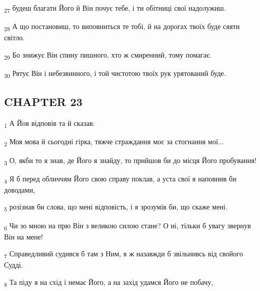 \begin{tcolorbox}
\textsubscript{27} будеш благати Його й Він почує тебе, і ти обітниці свої надолужиш.
\end{tcolorbox}
\begin{tcolorbox}
\textsubscript{28} А що постановиш, то виповниться те тобі, й на дорогах твоїх буде сяяти світло.
\end{tcolorbox}
\begin{tcolorbox}
\textsubscript{29} Бо знижує Він спину пишного, хто ж смиренний, тому помагає.
\end{tcolorbox}
\begin{tcolorbox}
\textsubscript{30} Рятує Він і небезвинного, і той чистотою твоїх рук урятований буде.
\end{tcolorbox}
\subsection{CHAPTER 23}
\begin{tcolorbox}
\textsubscript{1} А Йов відповів та й сказав:
\end{tcolorbox}
\begin{tcolorbox}
\textsubscript{2} Моя мова й сьогодні гірка, тяжче страждання моє за стогнання мої...
\end{tcolorbox}
\begin{tcolorbox}
\textsubscript{3} О, якби то я знав, де Його я знайду, то прийшов би до місця Його пробування!
\end{tcolorbox}
\begin{tcolorbox}
\textsubscript{4} Я б перед обличчям Його свою справу поклав, а уста свої я наповнив би доводами,
\end{tcolorbox}
\begin{tcolorbox}
\textsubscript{5} розізнав би слова, що мені відповість, і я зрозумів би, що скаже мені.
\end{tcolorbox}
\begin{tcolorbox}
\textsubscript{6} Чи зо мною на прю Він з великою силою стане? О ні, тільки б увагу звернув Він на мене!
\end{tcolorbox}
\begin{tcolorbox}
\textsubscript{7} Справедливий судився б там з Ним, я ж назавжди б звільнивсь від свойого Судді.
\end{tcolorbox}
\begin{tcolorbox}
\textsubscript{8} Та піду я на схід і немає Його, а на захід удамся Його не побачу,
\end{tcolorbox}

